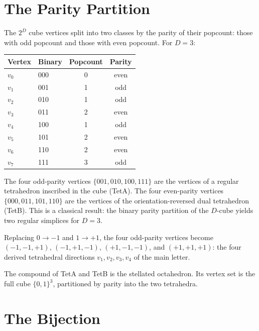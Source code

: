 \documentclass[twocolumn]{iopjournal}
\begin{document}

\section*{The Parity Partition}

The $2^D$ cube vertices split into two classes by the parity of their popcount: those with odd popcount and those with even popcount. For $D = 3$:

\vspace{6pt}
\noindent
\begin{tabular*}{\columnwidth}{@{\extracolsep{\fill}}llcc@{}}
\hline
Vertex & Binary & Popcount & Parity \\
\hline
$v_0$ & 000 & 0 & even \\
$v_1$ & 001 & 1 & odd \\
$v_2$ & 010 & 1 & odd \\
$v_3$ & 011 & 2 & even \\
$v_4$ & 100 & 1 & odd \\
$v_5$ & 101 & 2 & even \\
$v_6$ & 110 & 2 & even \\
$v_7$ & 111 & 3 & odd \\
\hline
\end{tabular*}
\vspace{6pt}

The four odd-parity vertices $\{001, 010, 100, 111\}$ are the vertices of a regular tetrahedron inscribed in the cube (TetA). The four even-parity vertices $\{000, 011, 101, 110\}$ are the vertices of the orientation-reversed dual tetrahedron (TetB). This is a classical result: the binary parity partition of the $D$-cube yields two regular simplices for $D = 3$.

Replacing $0 \to -1$ and $1 \to +1$, the four odd-parity vertices become $(-1,-1,+1)$, $(-1,+1,-1)$, $(+1,-1,-1)$, and $(+1,+1,+1)$: the four derived tetrahedral directions $v_1, v_2, v_3, v_4$ of the main letter.

The compound of TetA and TetB is the stellated octahedron. Its vertex set is the full cube $\{0,1\}^3$, partitioned by parity into the two tetrahedra.


\section*{The Bijection}
\end{document}
